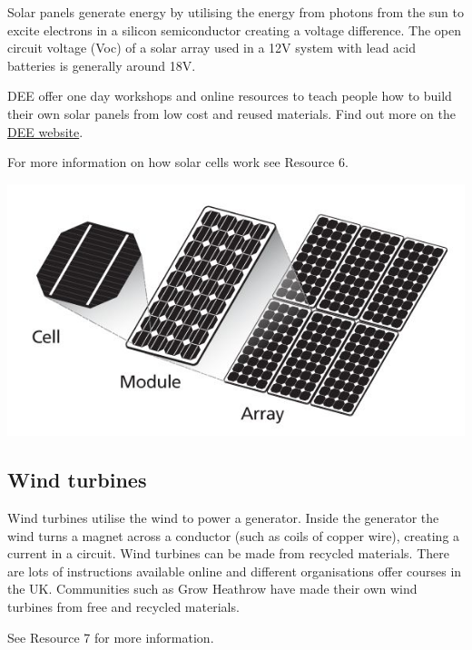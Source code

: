 \documentclass{article}
\theoremstyle{definition}
\theoremstyle{definition}
\theoremstyle{remark}
\begin{document}
    Solar panels generate energy by utilising the energy from photons from the sun to excite electrons in a silicon semiconductor creating a voltage difference. The open circuit voltage (Voc) of a solar array used in a 12V system with lead acid batteries is generally around 18V. 

    DEE offer one day workshops and online resources to teach people how to build their own solar panels from low cost and reused materials. Find out more on the \href{http://www.demandenergyequality.org/}{DEE website}.

    For more information on how solar cells work see Resource 6.
    
    \begin{center}
      \includegraphics[width=0.45\paperwidth]{Images/image_4_1_(solar_breakdown).png}
    \end{center}
  

  \subsection{Wind turbines} %
  \label{sub:wind_turbines}

    Wind turbines utilise the wind to power a generator. Inside the generator the wind turns a magnet across a conductor (such as coils of copper wire), creating a current in a circuit. Wind turbines can be made from recycled materials. There are lots of instructions available online and different organisations offer courses in the UK. Communities such as Grow Heathrow have made their own wind turbines from free and recycled materials.

    See Resource 7 for more information.
  
\end{document}
